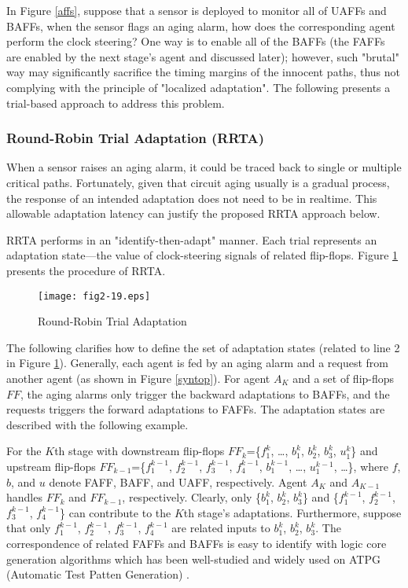 In Figure \ref{affs}, suppose that a sensor is deployed to monitor all of UAFFs and BAFFs, when the sensor flags an aging alarm, how does the corresponding agent perform the clock steering? One way is to enable all of the BAFFs (the FAFFs are enabled by the next stage's agent and discussed later); however, such "brutal" way may significantly sacrifice the timing margins of the innocent paths, thus not complying with the principle of "localized adaptation". The following presents a trial-based approach to address this problem.

\subsubsection{Round-Robin Trial Adaptation (RRTA)}\label{section_rrta}

When a sensor raises an aging alarm, it could be traced back to single or multiple critical paths. Fortunately, given that circuit aging usually is a gradual process, the response of an intended adaptation does not need to be in realtime. This allowable adaptation latency can justify the proposed RRTA approach below.

RRTA performs in an "identify-then-adapt" manner. Each trial represents an adaptation state---the value of clock-steering signals of related flip-flops. Figure \ref{rradp} presents the procedure of RRTA.

\begin{figure}[h]
\centering
\texttt{[image: fig2-19.eps]}%
   \caption{Round-Robin Trial Adaptation}\label{rradp}
\end{figure}

The following clarifies how to define the set of adaptation states (related to line 2 in Figure \ref{rradp}). Generally, each agent is fed by an aging alarm and a request from another agent (as shown in Figure \ref{syntop}). For agent $A_K$ and a set of flip-flops $FF$, the aging alarms only trigger the backward adaptations to BAFFs, and the requests triggers the forward adaptations to FAFFs. The adaptation states are described with the following example.

\exmp\label{rrtaexample}  For the $K$th stage with downstream flip-flops $FF_k$=\{$f_1^k$, \ldots, $b_1^k$, $b_2^k$, $b_3^k$, $u_1^k$\} and upstream flip-flops $FF_{k-1}$=\{$f_1^{k-1}$, $f_2^{k-1}$, $f_3^{k-1}$, $f_4^{k-1}$, $b_1^{k-1}$, \ldots, $u_1^{k-1}$, \ldots\}, where $f$, $b$, and $u$ denote FAFF, BAFF, and UAFF, respectively. Agent $A_K$ and  $A_{K-1}$ handles $FF_k$ and $FF_{k-1}$, respectively. Clearly, only \{$b_1^k$, $b_2^k$, $b_3^k$\} and \{$f_1^{k-1}$, $f_2^{k-1}$, $f_3^{k-1}$, $f_4^{k-1}$\} can contribute to the $K$th stage's adaptations. Furthermore, suppose that only $f_1^{k-1}$, $f_2^{k-1}$, $f_3^{k-1}$, $f_4^{k-1}$ are related inputs to $b_1^k$, $b_2^k$, $b_3^k$. The correspondence of related FAFFs and BAFFs is easy to identify with logic core generation algorithms which has been well-studied and widely used on ATPG (Automatic Test Patten Generation) \cite{POIROT_00}.

